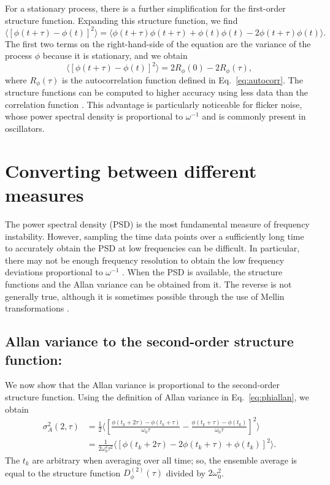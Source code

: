For a stationary process, there is a further simplification for the first-order structure function. Expanding this structure function, we find
%
\begin{equation}
\label{eq:structureexpansion}
\langle [\phi(t+\tau) - \phi(t)]^2 \rangle = \langle \phi(t+\tau)\phi(t+\tau) + \phi(t)\phi(t) - 2\phi(t+\tau)\phi(t) \rangle.
\end{equation}
%
The first two terms on the right-hand-side of the equation are the variance of the process $\phi$ because it is stationary, and we obtain
%
\begin{equation}
\label{eq:structuretoautocorr}
\langle [\phi(t+\tau) - \phi(t)]^2 \rangle = 2R_\phi(0) - 2R_\phi(\tau),
\end{equation}
%
where $R_\phi(\tau)$ is the autocorrelation function defined in Eq.~\ref{eq:autocorr}. The structure functions can be computed to higher accuracy using less data than the correlation function \cite{Schulz-DuBois1981}. This advantage is particularly noticeable for flicker noise, whose power spectral density is proportional to $\omega^{-1}$ and is commonly present in oscillators.

\section{Converting between different measures} \label{sec:convert}
%
The power spectral density (PSD) is the most fundamental measure of frequency instability. However, sampling the time data points over a sufficiently long time to accurately obtain the PSD at low frequencies can be difficult. In particular, there may not be enough frequency resolution to obtain the low frequency deviations proportional to $\omega^{-1}$ \cite{LohFlicker}. When the PSD is available, the structure functions and the Allan variance can be obtained from it. The reverse is not generally true, although it is sometimes possible through the use of Mellin transformations \cite{Kartaschoff1978, Lindsey1976}.

\subsection{Allan variance to the second-order structure function:}
%
We now show that the Allan variance is proportional to the second-order structure function. Using the definition of Allan variance in Eq.~\ref{eq:phiallan}, we obtain
%
\begin{align} \label{eq:avtosf}
\nonumber \sigma_A^2(2, \tau) &= \frac{1}{2}\bigg\langle \left[\frac{\phi(t_k+2\tau) - \phi(t_k+\tau)}{\omega_0\tau} - \frac{\phi(t_k+\tau) - \phi(t_k)}{\omega_0\tau}\right]^2 \bigg\rangle \\
&= \frac{1}{2\omega_0^2\tau^2} \langle\left[ \phi(t_k+2\tau) - 2\phi(t_k+\tau) + \phi(t_k) \right]^2\rangle.
\end{align}
%
The $t_k$ are arbitrary when averaging over all time; so, the ensemble average is equal to the structure function $D_\phi^{(2)}(\tau)$ divided by $2\omega_0^2$.

